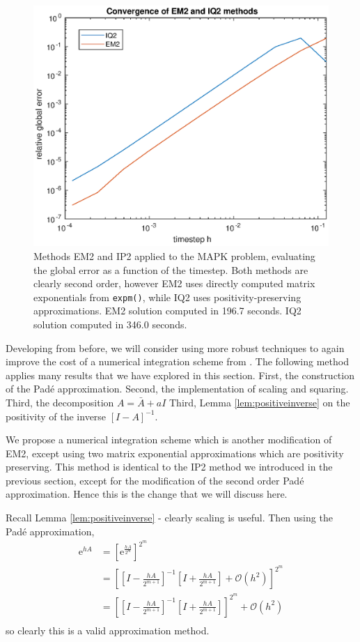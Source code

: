 \begin{figure}
    \centering
    \includegraphics[width=0.75\linewidth]{Matlab/positivemapk.eps}
    \caption{
        Methods EM2 and IP2 applied to the MAPK problem, evaluating the global error as a function of the timestep.
        Both methods are clearly second order, however EM2 uses directly computed matrix exponentials from \texttt{expm()},
        while IQ2 uses positivity-preserving approximations.
        EM2 solution computed in 196.7 seconds.
        IQ2 solution computed in 346.0 seconds.
    }
    \label{fig:pademapkpos}
\end{figure}

Developing from before, we will consider using more robust techniques to again improve the cost of a numerical integration scheme from \cite{blanes_pos_2022}.
The following method applies many results that we have explored in this section.
First, the construction of the Pad\'e approximation.
Second, the implementation of scaling and squaring.
Third, the decomposition $A = \bar{A} + a I$
Third, Lemma \ref{lem:positiveinverse} on the positivity of the inverse $[I - A]^{-1}$.

We propose a numerical integration scheme which is another modification of EM2, except using two matrix exponential approximations which are positivity preserving.
This method is identical to the IP2 method we introduced in the previous section, except for the modification of the second order Pad\'e approximation.
Hence this is the change that we will discuss here.

Recall Lemma \ref{lem:positiveinverse} - clearly scaling is useful.
Then using the Pad\'e approximation,
\begin{align*}
    \mathrm{e}^{hA} &= \left[ \mathrm{e}^\frac{hA}{2^m} \right]^{2^m} \\
    &= \left[
        \left[ I - \frac{hA}{2^{m+1}} \right]^{-1} \left[ I + \frac{hA}{2^{m+1}} \right] + \mathcal{O}(h^2)
    \right]^{2^m} \\
    &= \left[
        \left[ I - \frac{hA}{2^{m+1}} \right]^{-1} \left[ I + \frac{hA}{2^{m+1}} \right]
    \right]^{2^m} + \mathcal{O}(h^2) \\
\end{align*} 
so clearly this is a valid approximation method.

